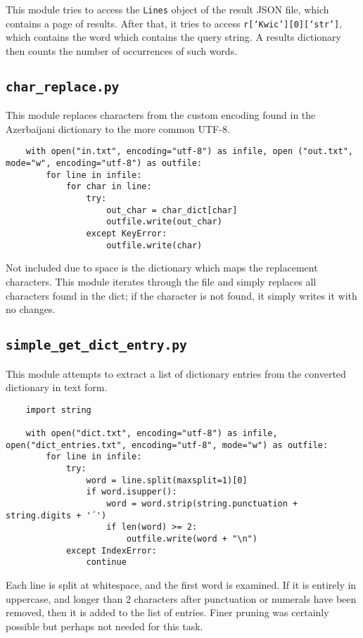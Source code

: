 \documentclass{article}      %
\begin{document}
	This module tries to access the \texttt{Lines} object of the result JSON file, which contains a page of results. After that, it tries to access \texttt{r[`Kwic'][0][`str']}, which contains the word which contains the query string. A results dictionary then counts the number of occurrences of such words.
	
	\subsection{\texttt{char\_replace.py}}
	
	This module replaces characters from the custom encoding found in the Azerbaijani dictionary to the more common UTF-8.
	
	\begin{verbatim}
	with open("in.txt", encoding="utf-8") as infile, open ("out.txt", mode="w", encoding="utf-8") as outfile:
		for line in infile:
			for char in line:
				try:
					out_char = char_dict[char]
					outfile.write(out_char)
				except KeyError:
					outfile.write(char)    
	\end{verbatim}
	
	Not included due to space is the dictionary which maps the replacement characters. This module iterates through the file and simply replaces all characters found in the dict; if the character is not found, it simply writes it with no changes.
	
	\subsection{\texttt{simple\_get\_dict\_entry.py}}
	
	This module attempts to extract a list of dictionary entries from the converted dictionary in text form.
	
	\begin{verbatim}
	import string
	
	with open("dict.txt", encoding="utf-8") as infile, open("dict_entries.txt", encoding="utf-8", mode="w") as outfile:
		for line in infile:
			try:
				word = line.split(maxsplit=1)[0]
				if word.isupper():
					word = word.strip(string.punctuation + string.digits + '´')
					if len(word) >= 2:
						outfile.write(word + "\n")
			except IndexError:
				continue
	\end{verbatim}
	
	Each line is split at whitespace, and the first word is examined. If it is entirely in uppercase, and longer than 2 characters after punctuation or numerals have been removed, then it is added to the list of entries. Finer pruning was certainly possible but perhaps not needed for this task.
	
\end{document}
